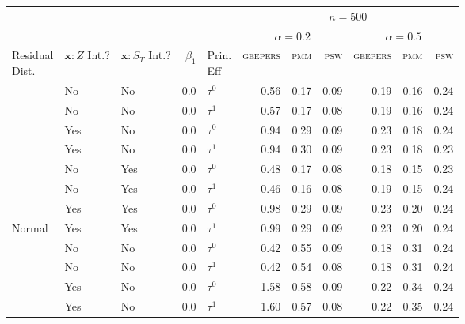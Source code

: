 
\begin{tabular}[t]{lllrlrrrrrr}
\toprule
\multicolumn{5}{c}{ } & \multicolumn{6}{c}{$n=500$} \\
\cmidrule(l{3pt}r{3pt}){6-11}
\multicolumn{5}{c}{ } & \multicolumn{3}{c}{$\alpha=0.2$} & \multicolumn{3}{c}{$\alpha=0.5$} \\
\cmidrule(l{3pt}r{3pt}){6-8} \cmidrule(l{3pt}r{3pt}){9-11}
\makecell[l]{Residual\\Dist.} & \makecell[l]{$\bm{x}:Z$\\Int.?} & \makecell[l]{$\bm{x}:S_T$\\Int.?} & $\beta_1$ & \makecell[l]{Prin.\\Eff} & \textsc{geepers} & \textsc{pmm} & \textsc{psw} & \textsc{geepers} & \textsc{pmm} & \textsc{psw}\\
\midrule
 & No & No & 0.0 & $\tau^0$ & 0.56 & 0.17 & 0.09 & 0.19 & 0.16 & 0.24\\

 & No & No & 0.0 & $\tau^1$ & 0.57 & 0.17 & 0.08 & 0.19 & 0.16 & 0.24\\

 & Yes & No & 0.0 & $\tau^0$ & 0.94 & 0.29 & 0.09 & 0.23 & 0.18 & 0.24\\

 & Yes & No & 0.0 & $\tau^1$ & 0.94 & 0.30 & 0.09 & 0.23 & 0.18 & 0.23\\

 & No & Yes & 0.0 & $\tau^0$ & 0.48 & 0.17 & 0.08 & 0.18 & 0.15 & 0.23\\

 & No & Yes & 0.0 & $\tau^1$ & 0.46 & 0.16 & 0.08 & 0.19 & 0.15 & 0.24\\

 & Yes & Yes & 0.0 & $\tau^0$ & 0.98 & 0.29 & 0.09 & 0.23 & 0.20 & 0.24\\

\multirow{-8}{*}{\raggedright\arraybackslash Normal} & Yes & Yes & 0.0 & $\tau^1$ & 0.99 & 0.29 & 0.09 & 0.23 & 0.20 & 0.24\\
\cmidrule{1-11}
 & No & No & 0.0 & $\tau^0$ & 0.42 & 0.55 & 0.09 & 0.18 & 0.31 & 0.24\\

 & No & No & 0.0 & $\tau^1$ & 0.42 & 0.54 & 0.08 & 0.18 & 0.31 & 0.24\\

 & Yes & No & 0.0 & $\tau^0$ & 1.58 & 0.58 & 0.09 & 0.22 & 0.34 & 0.24\\

 & Yes & No & 0.0 & $\tau^1$ & 1.60 & 0.57 & 0.08 & 0.22 & 0.35 & 0.24\\


\end{tabular}
